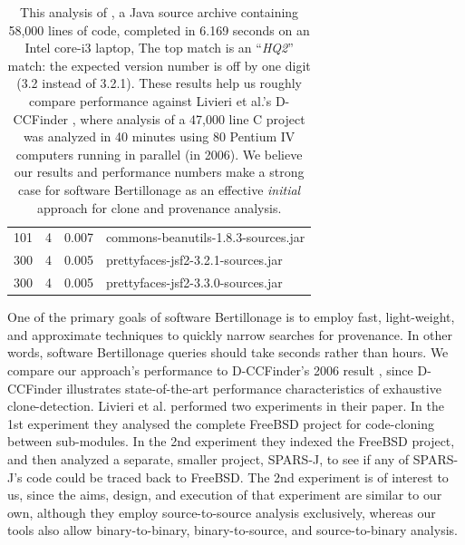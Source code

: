 \begin{table}[h]
\begin{tabular}[htbp]{r|r|r|l}
101 &             4 &  0.007  & commons-beanutils-1.8.3-sources.jar \\
300 &             4 &  0.005  & prettyfaces-jsf2-3.2.1-sources.jar \\
300 &             4 &  0.005  & prettyfaces-jsf2-3.3.0-sources.jar \\
\end{tabular}
\caption{
This analysis
of , a Java source archive
containing 58,000 lines of code, completed in
6.169 seconds on an Intel core-i3 laptop,
The top match is an ``\emph{HQ2}'' match:
the expected version number is off by one digit (3.2 instead of 3.2.1).
These results help us roughly compare performance
against Livieri et al.'s D-CCFinder \cite{LivieriHMI07}, where
analysis of a 47,000 line C project was analyzed in 40 minutes
using 80 Pentium IV computers running in parallel (in 2006).
We believe our results and performance numbers make a strong
case for software Bertillonage as an effective \emph{initial} approach for clone and provenance
analysis.}
\label{tab:src2src}
\end{table}




One of the primary goals of software Bertillonage is to employ fast, light-weight, and approximate
techniques to quickly narrow searches for provenance.
In other words, software Bertillonage queries should take seconds rather than hours.
We compare our approach's performance to D-CCFinder's 2006 result \cite{LivieriHMI07},
since D-CCFinder illustrates state-of-the-art performance characteristics of exhaustive
clone-detection.
Livieri et al. performed two experiments in their paper.  In the 1st experiment
they analysed the complete FreeBSD project for code-cloning between sub-modules.
In the 2nd experiment they indexed the FreeBSD project, and then analyzed a separate,
smaller project, SPARS-J, to see if any of SPARS-J's code could be traced back to FreeBSD.
The 2nd experiment is of interest to us, since the aims, design, and execution
of that experiment are similar to our own, although they employ source-to-source
analysis exclusively, whereas our tools also allow binary-to-binary, binary-to-source, and source-to-binary
analysis.

